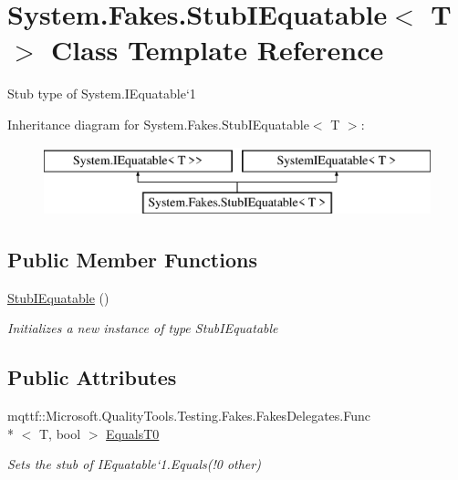 \hypertarget{class_system_1_1_fakes_1_1_stub_i_equatable_3_01_t_01_4}{\section{System.\-Fakes.\-Stub\-I\-Equatable$<$ T $>$ Class Template Reference}
\label{class_system_1_1_fakes_1_1_stub_i_equatable_3_01_t_01_4}
}


Stub type of System.\-I\-Equatable`1 


Inheritance diagram for System.\-Fakes.\-Stub\-I\-Equatable$<$ T $>$\-:\begin{figure}[H]
\begin{center}
\leavevmode
\includegraphics[height=2.000000cm]{class_system_1_1_fakes_1_1_stub_i_equatable_3_01_t_01_4}
\end{center}
\end{figure}
\subsection*{Public Member Functions}
\begin{DoxyCompactItemize}
\item 
\hyperlink{class_system_1_1_fakes_1_1_stub_i_equatable_3_01_t_01_4_a8e4c66921c645335e76f1b5515cbe317}{Stub\-I\-Equatable} ()
\begin{DoxyCompactList}\small\item\em Initializes a new instance of type Stub\-I\-Equatable\end{DoxyCompactList}\end{DoxyCompactItemize}
\subsection*{Public Attributes}
\begin{DoxyCompactItemize}
\item 
mqttf\-::\-Microsoft.\-Quality\-Tools.\-Testing.\-Fakes.\-Fakes\-Delegates.\-Func\\*
$<$ T, bool $>$ \hyperlink{class_system_1_1_fakes_1_1_stub_i_equatable_3_01_t_01_4_aba63e741b1d9da3eabc36519b5f794a9}{Equals\-T0}
\begin{DoxyCompactList}\small\item\em Sets the stub of I\-Equatable`1.Equals(!0 other)\end{DoxyCompactList}\end{DoxyCompactItemize}


